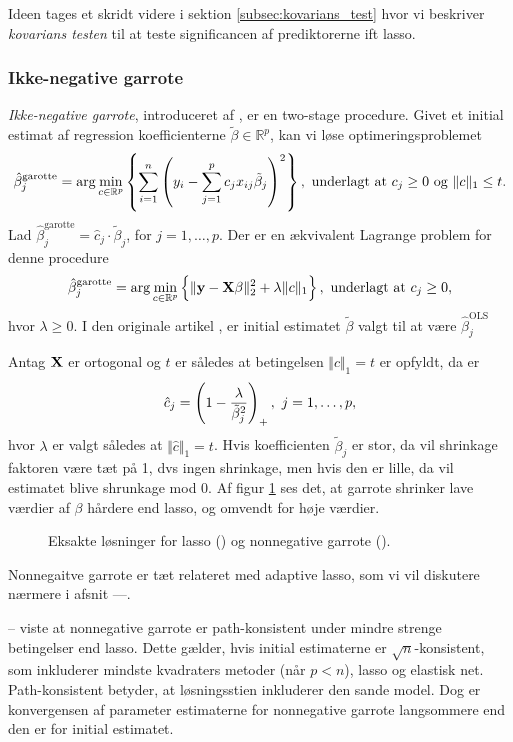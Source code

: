 Ideen tages et skridt videre i sektion \ref{subsec:kovarians_test} hvor vi beskriver \textit{kovarians testen} til at teste significancen af prediktorerne ift lasso.


\subsubsection{Ikke-negative garrote}
\textit{Ikke-negative garrote}, introduceret af \citep{nonnegative_garrote}, er en two-stage procedure. 
Givet et initial estimat af regression koefficienterne \(\tilde{\beta} \in \mathbb{R}^p\), kan vi løse optimeringsproblemet
\begin{align}
\hat{\beta}_j^\text{garotte} = \arg \min_{c \in \mathbb{R}^p}  \cbr{ \sum_{i=1}^n \del{y_i - \sum_{j=1}^p c_j x_{ij} \tilde{\beta}_j}^2}, \ \text{underlagt at } c_j \geq 0 \text{ og } \Vert c \Vert_1 \leq t. \label{eq:2.19}
\end{align}
Lad \(\hat{\beta}_j^\text{garotte} = \hat{c}_j \cdot \tilde{\beta}_j\), for \(j = 1, \ldots, p\).
Der er en ækvivalent Lagrange problem for denne procedure
\begin{align*}
\hat{\beta}_j^\text{garotte} = \arg \min_{c \in \mathbb{R}^p}  \cbr{\Vert \y - \X \beta \Vert_2^2 + \lambda \Vert c \Vert_1}, \ \text{underlagt at } c_j \geq 0,
\end{align*}
hvor \(\lambda \geq 0\).
I den originale artikel \citep{nonnegative_garrote}, er initial estimatet \(\tilde{\beta}\) valgt til at være \(\hat{\beta}_j^\text{OLS}\)

Antag \(\mathbf{X}\) er ortogonal og \(t\) er således at betingelsen \(\Vert c \Vert_1 = t\) er opfyldt, da er
\begin{align*}
\hat{c}_j = \del{1 - \frac{\lambda}{\tilde{\beta}_j^2}}_+, \ j = 1, \ldots, p,
\end{align*}
hvor \(\lambda\) er valgt således at \(\Vert \hat{c} \Vert_1 = t\).
Hvis koefficienten \(\tilde{\beta}_j\) er stor, da vil shrinkage faktoren være tæt på 1, dvs ingen shrinkage, men hvis den er lille, da vil estimatet blive shrunkage mod 0.
Af figur \ref{fig:nonnegative_garrote} ses det, at garrote shrinker lave værdier af \(\beta\) hårdere end lasso, og omvendt for høje værdier.
%
\begin{figure}[H]
\centering
\scalebox{0.8}{}
\caption[optional short text]{Eksakte løsninger for lasso () og nonnegative garrote ().} \label{fig:nonnegative_garrote}
\end{figure}
%
Nonnegaitve garrote er tæt relateret med adaptive lasso, som vi vil diskutere nærmere i afsnit ---.

-- viste at nonnegative garrote er path-konsistent under mindre strenge betingelser end lasso.
Dette gælder, hvis initial estimaterne er \(\sqrt{n}\)-konsistent, som inkluderer mindste kvadraters metoder (når \(p < n\)), lasso og elastisk net.
Path-konsistent betyder, at løsningsstien inkluderer den sande model.
Dog er konvergensen af parameter estimaterne for nonnegative garrote langsommere end den er for initial estimatet.
\newpage
 